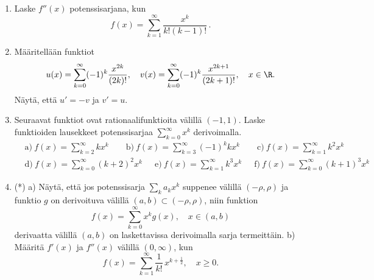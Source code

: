 \Harj
\begin{enumerate}

\item
Laske $f''(x)$ potenssisarjana, kun
\[
f(x)=\sum_{k=1}^\infty \frac{x^k}{k!(k-1)!}\,.
\]

\item \label{H-V-4: cos ja sin potenssisarjoina}
Määritellään funktiot
\[
u(x)=\sum_{k=0}^\infty (-1)^k \frac{x^{2k}}{(2k)!}, \quad
v(x)=\sum_{k=0}^\infty (-1)^k \frac{x^{2k+1}}{(2k+1)!}, \quad x\in\R.
\]
Näytä, että $u'=-v$ ja $v'=u$.
 
\item
Seuraavat funktiot ovat rationaalifunktioita välillä $(-1,1)$. Laske funktioiden lausekkeet
potenssisarjaa $\sum_{k=0}^\infty x^k$ derivoimalla.
\begin{align*}
&\text{a)}\ f(x)=\sum_{k=2}^\infty kx^k \qquad 
 \text{b)}\ f(x)=\sum_{k=3}^\infty (-1)^k kx^k \qquad
 \text{c)}\ f(x)=\sum_{k=1}^\infty k^2 x^k \\
&\text{d)}\ f(x)=\sum_{k=0}^\infty (k+2)^2 x^k \quad\ \
 \text{e)}\ f(x)=\sum_{k=1}^\infty k^3 x^k \quad\ \
 \text{f)}\ f(x)=\sum_{k=0}^\infty (k+1)^3 x^k 
\end{align*}

\item (*)
a) Näytä, että jos potenssisarja $\sum_k a_k x^k$ suppenee välillä $(-\rho,\rho)$ ja
funktio $g$ on derivoituva välillä $(a,b)\subset(-\rho,\rho)$, niin funktion
\[
f(x) = \sum_{k=0}^\infty x^k g(x), \quad x\in(a,b)
\]
derivaatta välillä $(a,b)$ on laskettavissa derivoimalla sarja
termeittäin.\vspace{1mm}\newline
b) Määritä $f'(x)$ ja $f''(x)$ välillä $(0,\infty)$, kun
\[
f(x) = \sum_{k=1}^\infty \frac{1}{k!}\,x^{k+\tfrac{1}{2}}, \quad x \ge 0.
\]
\end{enumerate}
